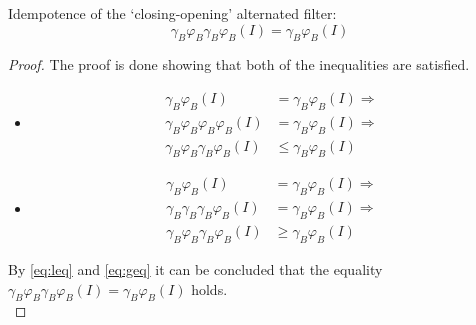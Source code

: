 \documentclass[12pt]{article}
\begin{document}
\begin{thm}
    Idempotence of the `closing-opening' alternated filter:
    $$
    \gamma_B\varphi_B\gamma_B\varphi_B(I) = \gamma_B\varphi_B(I)
    $$
    
    \begin{proof}
        The proof is done showing that both of the inequalities are satisfied.
        \begin{itemize}
            \item[]
            \noindent{}
            \begin{equation}
            \begin{aligned}
                \gamma_B\varphi_B(I) &= \gamma_B\varphi_B(I) \Rightarrow \\
                \gamma_B\varphi_B\varphi_B\varphi_B(I) &= \gamma_B\varphi_B(I) \Rightarrow \\
                \gamma_B\varphi_B\gamma_B\varphi_B(I) &\leq \gamma_B\varphi_B(I)
            \end{aligned}
            \label{eq:leq}
            \end{equation}
            \item[]
            \noindent{}
            \begin{equation}
            \begin{aligned}
                \gamma_B\varphi_B(I) &= \gamma_B\varphi_B(I) \Rightarrow \\
                \gamma_B\gamma_B\gamma_B\varphi_B(I) &= \gamma_B\varphi_B(I) \Rightarrow \\
                \gamma_B\varphi_B\gamma_B\varphi_B(I) &\geq \gamma_B\varphi_B(I)
            \end{aligned}
            \label{eq:geq}
            \end{equation}
        \end{itemize}
        By \eqref{eq:leq} and \eqref{eq:geq} it can be concluded that the equality $\gamma_B\varphi_B\gamma_B\varphi_B(I) = \gamma_B\varphi_B(I)$ holds. \\
    \end{proof}
\end{thm}
\end{document}
